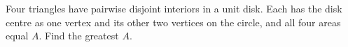 Four triangles have pairwise disjoint interiors in a unit disk. Each has the disk centre as one vertex and its other two vertices on the circle, and all four areas equal $ A $. Find the greatest $ A $.
